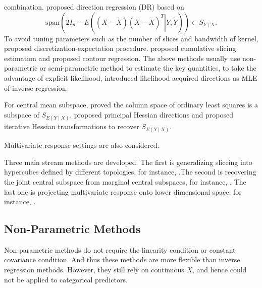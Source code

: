 combination. \citet{li2007directional} proposed direction regression
(DR) based on 
\[
\mathrm{span}\left(2I_{p}-E\left(\left.\left(X-\tilde{X}\right)\left(X-\tilde{X}\right)^{T}\right|Y,\tilde{Y}\right)\right)\subset S_{Y\mid X}.
\]
To avoid tuning parameters such as the number of slices and bandwidth
of kernel, \citet{zhu2010sufficient} proposed discretization-expectation
procedure. \citet{zhu2010dimension} proposed cumulative slicing estimation
and \citet{li2005contour} proposed contour regression. The above
methods usually use non-parametric or semi-parametric method to estimate
the key quantities, to take the advantage of explicit likelihood,
\citet{cook2009likelihood} introduced likelihood acquired directions
as MLE of inverse regression. 

For central mean subspace, \citet{li1989regression} proved the column
space of ordinary least squares is a subspace of $S_{E\left(Y\mid X\right)}$.
\citet{li1992principal} proposed principal Hessian directions and
\citet{cook2002dimension} proposed iterative Hessian transformations
to recover $S_{E\left(Y\mid X\right)}$. 

Multivariate response settings are also considered. %
\begin{comment}
add envelope and dr ask dr su 
\end{comment}
Three main stream methods are developed. The first is generalizing
sliceing into hypercubes defined by different topologies, for instance,
\citet{aragon1997gauss,hsing1999nearest,setodji2004k}.The second
is recovering the joint central subspace from marginal central subspaces,
for instance, \citet{cook2003model,saracco2005asymptotics,yin2006moment}.
The last one is projecting multivariate response onto lower dimensional
space, for instance, \citet{li2008projective,zhu2010dimension}. 


\subsection{Non-Parametric Methods}

Non-parametric methods do not require the linearity condition or constant
covariance condition. And thus these methods are more flexible than
inverse regression methods. However, they still rely on continuous
$X$, and hence could not be applied to categorical predictors.

